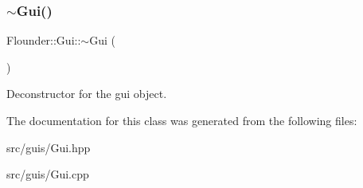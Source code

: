 \subsubsection{\texorpdfstring{$\sim$\+Gui()}{~Gui()}}
{\footnotesize\ttfamily Flounder\+::\+Gui\+::$\sim$\+Gui (\begin{DoxyParamCaption}{ }\end{DoxyParamCaption})}



Deconstructor for the gui object. 



The documentation for this class was generated from the following files\+:\begin{DoxyCompactItemize}
\item 
src/guis/Gui.\+hpp\item 
src/guis/Gui.\+cpp\end{DoxyCompactItemize}
